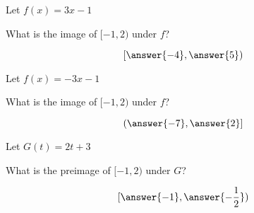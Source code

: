 \documentclass{ximera}
\author{Lee Wayand}
\begin{document}
\begin{exercise}








\begin{question}



Let $f(x) = 3x - 1$

What is the image of $[-1, 2)$ under $f$?

\[
[ \answer{-4}, \answer{5} )
\]



\end{question}







\begin{question}



Let $f(x) = -3x - 1$

What is the image of $[-1, 2)$ under $f$?

\[
( \answer{-7}, \answer{2} ]
\]



\end{question}











\begin{question}



Let $G(t) = 2t + 3$

What is the preimage of $[-1, 2)$ under $G$?

\[
[ \answer{-1}, \answer{-\frac{1}{2}} )
\]



\end{question}










\end{exercise}
\end{document}
